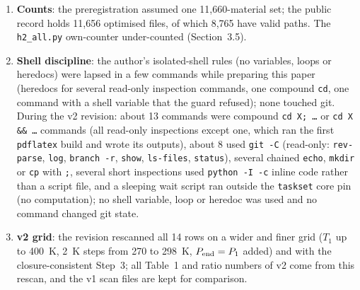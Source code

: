 \documentclass[10pt]{article}
\begin{document}
\begin{enumerate}
\item \textbf{Counts}: the preregistration assumed one 11,660-material set; the public record holds 11,656 optimised files, of which 8,765 have valid paths. The \texttt{h2\_all.py} own-counter under-counted (Section~3.5).
\item \textbf{Shell discipline}: the author's isolated-shell rules (no variables, loops or heredocs) were lapsed in a few commands while preparing this paper (heredocs for several read-only inspection commands, one compound \texttt{cd}, one command with a shell variable that the guard refused); none touched git. During the v2 revision: about 13 commands were compound \texttt{cd X; \ldots} or \texttt{cd X \&\& \ldots} commands (all read-only inspections except one, which ran the first \texttt{pdflatex} build and wrote its outputs), about 8 used \texttt{git -C} (read-only: \texttt{rev-parse}, \texttt{log}, \texttt{branch -r}, \texttt{show}, \texttt{ls-files}, \texttt{status}), several chained \texttt{echo}, \texttt{mkdir} or \texttt{cp} with \texttt{;}, several short inspections used \texttt{python -I -c} inline code rather than a script file, and a sleeping wait script ran outside the \texttt{taskset} core pin (no computation); no shell variable, loop or heredoc was used and no command changed git state.
\item \textbf{v2 grid}: the revision rescanned all 14 rows on a wider and finer grid ($T_1$ up to 400~K, 2~K steps from 270 to 298~K, $P_{\rm end}=P_1$ added) and with the closure-consistent Step~3; all Table~1 and ratio numbers of v2 come from this rescan, and the v1 scan files are kept for comparison.
\end{enumerate}
\end{document}
